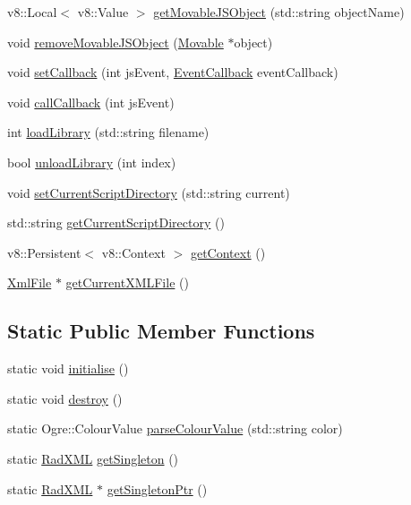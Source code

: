 \begin{DoxyCompactItemize}
v8\-::\-Local$<$ v8\-::\-Value $>$ \hyperlink{class_rad_xml_1_1_rad_x_m_l_afc596cfcdb3f8a50a4c0aee3819b337c}{get\-Movable\-J\-S\-Object} (std\-::string object\-Name)
\item 
void \hyperlink{class_rad_xml_1_1_rad_x_m_l_abf9e1e7a563a5c2e300145271bdb44b2}{remove\-Movable\-J\-S\-Object} (\hyperlink{class_rad_xml_1_1_movable}{Movable} $\ast$object)
\item 
void \hyperlink{class_rad_xml_1_1_rad_x_m_l_aebc4d95f1ff43cfbee5ea633b4b3ec94}{set\-Callback} (int js\-Event, \hyperlink{class_rad_xml_1_1_rad_x_m_l_ab812a58a3bf015e646979a83309db244}{Event\-Callback} event\-Callback)
\item 
void \hyperlink{class_rad_xml_1_1_rad_x_m_l_a68e3f128a846ef714f3c118abe1cb153}{call\-Callback} (int js\-Event)
\item 
int \hyperlink{class_rad_xml_1_1_rad_x_m_l_a8a335ffee89c8db74f71f23cf83af58b}{load\-Library} (std\-::string filename)
\item 
bool \hyperlink{class_rad_xml_1_1_rad_x_m_l_aeb5bf3a6bf753f894ab28b695ff6e1da}{unload\-Library} (int index)
\item 
void \hyperlink{class_rad_xml_1_1_rad_x_m_l_a9b56f0eae142dd1644a79391bc97a6d1}{set\-Current\-Script\-Directory} (std\-::string current)
\item 
std\-::string \hyperlink{class_rad_xml_1_1_rad_x_m_l_a39e648e4643404be3622247ada61d70a}{get\-Current\-Script\-Directory} ()
\item 
v8\-::\-Persistent$<$ v8\-::\-Context $>$ \hyperlink{class_rad_xml_1_1_rad_x_m_l_afde22fd92b03c957d47fc30d8e1f26b0}{get\-Context} ()
\item 
\hyperlink{class_rad_xml_1_1_xml_file}{Xml\-File} $\ast$ \hyperlink{class_rad_xml_1_1_rad_x_m_l_a8c7a0aacce23709faf0b5eeb219dbebd}{get\-Current\-X\-M\-L\-File} ()
\end{DoxyCompactItemize}
\subsection*{Static Public Member Functions}
\begin{DoxyCompactItemize}
\item 
static void \hyperlink{class_rad_xml_1_1_rad_x_m_l_a1c3fdc53fc12f0b0306e7fca3f4754ba}{initialise} ()
\item 
static void \hyperlink{class_rad_xml_1_1_rad_x_m_l_ac2a42f6f14acd52833b05343872add3a}{destroy} ()
\item 
static Ogre\-::\-Colour\-Value \hyperlink{class_rad_xml_1_1_rad_x_m_l_a7315c2bd1b0b113cdc4c541a683610a0}{parse\-Colour\-Value} (std\-::string color)
\item 
static \hyperlink{class_rad_xml_1_1_rad_x_m_l}{Rad\-X\-M\-L} \hyperlink{class_rad_xml_1_1_rad_x_m_l_aece004da354d8f75c38f6b3642005f90}{get\-Singleton} ()
\item 
static \hyperlink{class_rad_xml_1_1_rad_x_m_l}{Rad\-X\-M\-L} $\ast$ \hyperlink{class_rad_xml_1_1_rad_x_m_l_af46149c0c6726a93fc875b38f85f702c}{get\-Singleton\-Ptr} ()
\end{DoxyCompactItemize}
